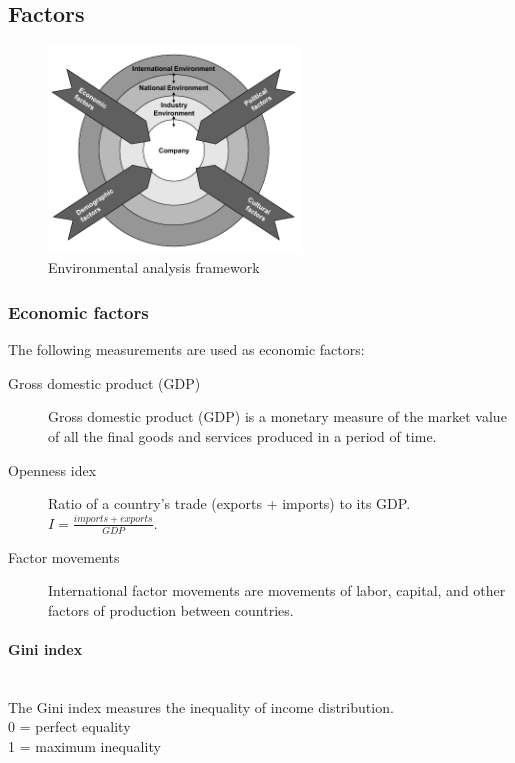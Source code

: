 \subsection{Factors}
\begin{figure}[H]
	\centering
	\includegraphics[width=0.6\textwidth]{figures/envAnalysisFramework.png}
	\caption{Environmental analysis framework}
\end{figure}

\subsubsection{Economic factors}

The following measurements are used as economic factors:

\begin{description}
	\item[Gross domestic product (GDP)] Gross domestic product (GDP) is a monetary measure of the market value of all the final goods and services produced in a period of time.
	\item[Openness idex] Ratio of a country's trade (exports + imports) to its GDP. $I = \frac{imports + exports}{GDP}$.
	\item[Factor movements] International factor movements are movements of labor, capital, and other factors of production between countries.
\end{description}

\paragraph{Gini index} \mbox{}\\
The Gini index measures the inequality of income distribution.\\
0 = perfect equality\\
1 = maximum inequality

